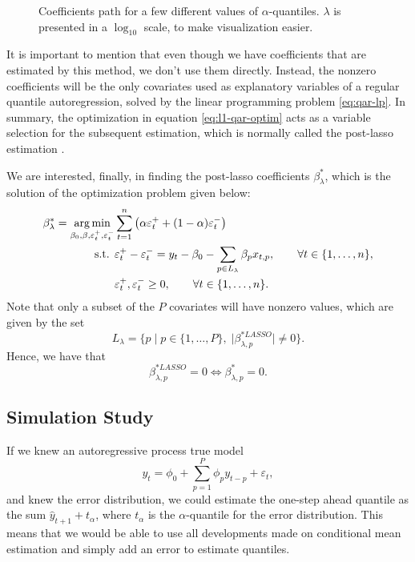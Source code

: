 \begin{figure}
\begin{minipage}[t]{0.4\linewidth}
\begin{minipage}[b]{\linewidth}
			\label{fig:npqar-cross}
		\end{minipage}
	\end{minipage}
	\caption{Coefficients path for a few different values of $\alpha$-quantiles. $\lambda$ is presented in a $\log_{10}$ scale, to make visualization easier.}
	\label{fig:npqar-results}
\end{figure}

It is important to mention that even though we have coefficients that are estimated by this method, we don't use them directly. Instead, the nonzero coefficients will be the only covariates used as explanatory variables of a regular quantile autoregression, solved by the linear programming problem \ref{eq:qar-lp}. In summary, the optimization in equation \ref{eq:l1-qar-optim} acts as a variable selection for the subsequent estimation, which is normally called the post-lasso estimation \cite{belloni2009least}.

We are interested, finally, in finding the post-lasso coefficients $\beta_\lambda^*$, which is the solution of the optimization problem given below:
\begin{equation}
\begin{aligned} \beta_\lambda^{*} = \operatorname*{arg\,min}_{\beta_0,\beta,\varepsilon_{t}^{+},\varepsilon_{t}^{-}} & \sum_{t=1}^{n}\left(\alpha\varepsilon_{t}^{+}+(1-\alpha)\varepsilon_{t}^{-}\right)\\
\mbox{s.t. } & \varepsilon_{t}^{+}-\varepsilon_{t}^{-}=y_{t} - \beta_0 - \sum_{p\in L_\lambda} \beta_p x_{t,p},\qquad\forall t\in\{1,\dots,n\},\\
& \varepsilon_t^+,\varepsilon_t^- \geq 0, \qquad \forall t \in \{1,\dots,n\}.
\end{aligned}
\label{eq:post-lasso}
\end{equation}
Note that only a subset of the $P$ covariates will have nonzero values, which are given by the set 
\begin{equation*}
L_\lambda = \{ p \; | \; p \in \{ 1,\dots,P \}, \; |\beta^{*LASSO}_{\lambda,p}| \neq 0  \}.
\end{equation*}
Hence, we have that
$$\beta^{*LASSO}_{\lambda,p} = 0 \iff \beta^{*}_{\lambda,p} = 0.$$


\subsection{Simulation Study}
\label{sec:simulation-ar1}
If we knew an autoregressive process true model
\[
y_t = \phi_0 + \sum_{p=1}^{P} \phi_p y_{t-p} + \varepsilon_t,
\]
and knew the error distribution, we could estimate the one-step ahead quantile as the sum $\hat{y}_{t+1} + t_{\alpha}$, where $t_\alpha$ is the $\alpha$-quantile for the error distribution. This means that we would be able to use all developments made on conditional mean estimation and simply add an error to estimate quantiles. 

